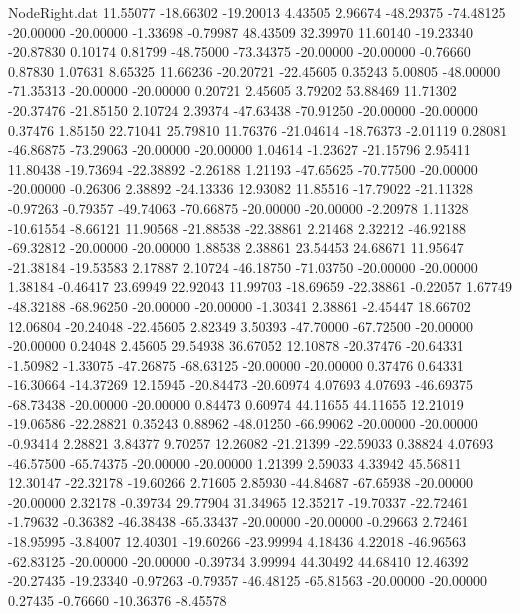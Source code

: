 \begin{filecontents}{NodeRight.dat}
  11.55077  -18.66302  -19.20013     4.43505    2.96674  -48.29375  -74.48125  -20.00000  -20.00000   -1.33698   -0.79987   48.43509   32.39970
  11.60140  -19.23340  -20.87830     0.10174    0.81799  -48.75000  -73.34375  -20.00000  -20.00000   -0.76660    0.87830    1.07631    8.65325
  11.66236  -20.20721  -22.45605     0.35243    5.00805  -48.00000  -71.35313  -20.00000  -20.00000    0.20721    2.45605    3.79202   53.88469
  11.71302  -20.37476  -21.85150     2.10724    2.39374  -47.63438  -70.91250  -20.00000  -20.00000    0.37476    1.85150   22.71041   25.79810
  11.76376  -21.04614  -18.76373    -2.01119    0.28081  -46.86875  -73.29063  -20.00000  -20.00000    1.04614   -1.23627  -21.15796    2.95411
  11.80438  -19.73694  -22.38892    -2.26188    1.21193  -47.65625  -70.77500  -20.00000  -20.00000   -0.26306    2.38892  -24.13336   12.93082
  11.85516  -17.79022  -21.11328    -0.97263   -0.79357  -49.74063  -70.66875  -20.00000  -20.00000   -2.20978    1.11328  -10.61554   -8.66121
  11.90568  -21.88538  -22.38861     2.21468    2.32212  -46.92188  -69.32812  -20.00000  -20.00000    1.88538    2.38861   23.54453   24.68671
  11.95647  -21.38184  -19.53583     2.17887    2.10724  -46.18750  -71.03750  -20.00000  -20.00000    1.38184   -0.46417   23.69949   22.92043
  11.99703  -18.69659  -22.38861    -0.22057    1.67749  -48.32188  -68.96250  -20.00000  -20.00000   -1.30341    2.38861   -2.45447   18.66702
  12.06804  -20.24048  -22.45605     2.82349    3.50393  -47.70000  -67.72500  -20.00000  -20.00000    0.24048    2.45605   29.54938   36.67052
  12.10878  -20.37476  -20.64331    -1.50982   -1.33075  -47.26875  -68.63125  -20.00000  -20.00000    0.37476    0.64331  -16.30664  -14.37269
  12.15945  -20.84473  -20.60974     4.07693    4.07693  -46.69375  -68.73438  -20.00000  -20.00000    0.84473    0.60974   44.11655   44.11655
  12.21019  -19.06586  -22.28821     0.35243    0.88962  -48.01250  -66.99062  -20.00000  -20.00000   -0.93414    2.28821    3.84377    9.70257
  12.26082  -21.21399  -22.59033     0.38824    4.07693  -46.57500  -65.74375  -20.00000  -20.00000    1.21399    2.59033    4.33942   45.56811
  12.30147  -22.32178  -19.60266     2.71605    2.85930  -44.84687  -67.65938  -20.00000  -20.00000    2.32178   -0.39734   29.77904   31.34965
  12.35217  -19.70337  -22.72461    -1.79632   -0.36382  -46.38438  -65.33437  -20.00000  -20.00000   -0.29663    2.72461  -18.95995   -3.84007
  12.40301  -19.60266  -23.99994     4.18436    4.22018  -46.96563  -62.83125  -20.00000  -20.00000   -0.39734    3.99994   44.30492   44.68410
  12.46392  -20.27435  -19.23340    -0.97263   -0.79357  -46.48125  -65.81563  -20.00000  -20.00000    0.27435   -0.76660  -10.36376   -8.45578

\end{filecontents}
